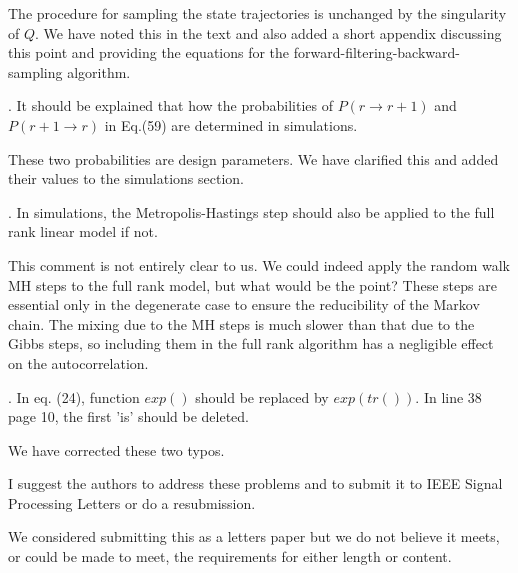 \documentclass{article}
\newenvironment{review}[0]{\begin{itshape}\color{Gray}\noindent}{\end{itshape}\vspace{0.4cm}}
\newenvironment{response}[0]{\noindent}{\vspace{0.4cm}}
\begin{document}
\begin{response}
 The procedure for sampling the state trajectories is unchanged by the singularity of $Q$. We have noted this in the text and also added a short appendix discussing this point and providing the equations for the forward-filtering-backward-sampling algorithm.
\end{response}

\begin{review}
6.  It should be explained that how the probabilities of $P(r \to r+1)$ and $P(r+1 \to r)$ in Eq.(59) are determined in simulations.
\end{review}

\begin{response}
 These two probabilities are design parameters. We have clarified this and added their values to the simulations section.
\end{response}

\begin{review}
7.  In simulations, the Metropolis-Hastings step should also be applied to the full rank linear model if not.
\end{review}

\begin{response}
This comment is not entirely clear to us. We could indeed apply the random walk MH steps to the full rank model, but what would be the point? These steps are essential only in the degenerate case to ensure the reducibility of the Markov chain. The mixing due to the MH steps is much slower than that due to the Gibbs steps, so including them in the full rank algorithm has a negligible effect on the autocorrelation.
\end{response}

\begin{review}
8.  In eq. (24), function $exp()$ should be replaced by $exp(tr())$. In line 38 page 10, the first 'is' should be deleted.
\end{review}

\begin{response}
 We have corrected these two typos.
\end{response}

\begin{review}
I suggest the authors to address these problems and to submit it to IEEE Signal Processing Letters or do a resubmission.
\end{review}

\begin{response}
 We considered submitting this as a letters paper but we do not believe it meets, or could be made to meet, the requirements for either length or content.
\end{response}
\end{document}
